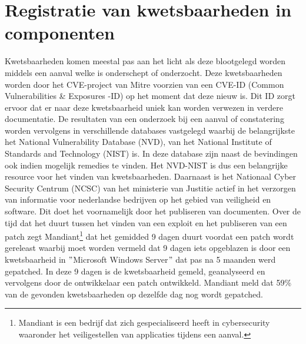 \section{Registratie van kwetsbaarheden in componenten}\label{sec:registratie-van-kwetsbaarheden-in-bibliotheken}
Kwetsbaarheden komen meestal pas aan het licht als deze blootgelegd worden middels een aanval welke is onderschept of onderzocht. Deze kwetsbaarheden worden door het CVE-project van Mitre voorzien van een CVE-ID (Common Vulnerabilities \& Exposures -ID) op het moment dat deze nieuw is. Dit ID zorgt ervoor dat er naar deze kwetsbaarheid uniek kan worden verwezen in verdere documentatie. De resultaten van een onderzoek bij een aanval of constatering worden vervolgens in verschillende databases vastgelegd waarbij de belangrijkste het National Vulnerability Database (NVD), van het National Institute of Standards and Technology (NIST) is.
In deze database zijn naast de bevindingen ook indien mogelijk remedies te vinden. Het NVD-NIST is dus een belangrijke resource voor het vinden van kwetsbaarheden. Daarnaast is het Nationaal Cyber Security Centrum (NCSC) van het ministerie van Justitie actief in het verzorgen van informatie voor nederlandse bedrijven op het gebied van veiligheid en software. Dit doet het voornamelijk door het publiseren van documenten.
Over de tijd dat het duurt tussen het vinden van een exploit en het publiseren van een patch zegt Mandiant\footnote{Mandiant is een bedrijf dat zich gespecialiseerd heeft in cybersecurity waaronder het veiligestellen van applicaties tijdens een aanval.} dat het gemidded 9 dagen duurt voordat een patch wordt gereleast waarbij moet worden vermeld dat 9 dagen iets opgeblazen is door een kwetsbaarheid in $"$Microsoft Windows Server$"$ dat pas na 5 maanden werd gepatched. In deze 9 dagen is de kwetsbaarheid gemeld, geanalyseerd en vervolgens door de ontwikkelaar een patch ontwikkeld. Mandiant meld dat 59\% van de gevonden kwetsbaarheden op dezelfde dag nog wordt gepatched. ~\citep{mandiant:2020}


